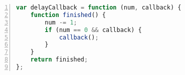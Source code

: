 \label{lst:source_images_delay}
\begin{lstlisting}[language=JavaScript,numbers=left,caption={Metoda łącząca wywołania wielu callbacków w jeden},label={lst:source_images_delay}]
var delayCallback = function (num, callback) {
    function finished() {
        num -= 1;
        if (num == 0 && callback) {
            callback();
        }
    }
    return finished;
};
\end{lstlisting}

